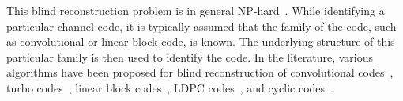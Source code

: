 \documentclass[10pt,journal]{IEEEtran}
\begin{document}
This blind reconstruction problem is in general NP-hard~\cite{Valembois2001}.
While identifying a particular channel code, it is typically assumed that the family of the code, such as convolutional or 
linear block code, is known. 
The underlying structure of this particular family is then used to identify the code.
% 
In the literature, various algorithms have been proposed for blind reconstruction of
convolutional codes~\cite{Marazin2011,DingelHau2007}, turbo codes~\cite{Barbier2005,CoteSen2010}, 
linear block codes~\cite{Valembois2001,SicotHouBaJournal2009,CluF2009}, LDPC codes~\cite{Cluzeau2006,Moosavi_journal}, 
and cyclic codes~\cite{LeeSong2012_Korea,Chabot_thesis,EuropeanWireless2014, TCOMM_2016, Zhou2013_Entropy_new,Zhou2013_Entropy}.
% 

\end{document}
